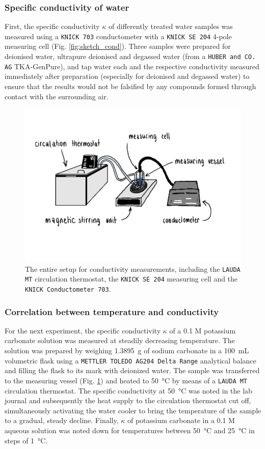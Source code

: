 \subsubsection{Specific conductivity of water}

First, the specific conductivity $\kappa$ of differently treated water samples was measured using a \texttt{KNICK 703} conductometer with a \texttt{KNICK SE 204} 4-pole measuring cell (Fig. \ref{fig:sketch_cond}). Three samples were prepared for deionised water, ultrapure deionised and degassed water (from a \texttt{HUBER and CO. AG} TKA-GenPure), and tap water each and the respective conductivity measured immediately after preparation (especially for deionised and degassed water) to ensure that the results would not be falsified by any compounds formed through contact with the surrounding air. 



\begin{figure}[H]
    \centering
    \includegraphics[width=.5\textwidth]{figures/Conductometer_bigpicture.pdf}
    \caption{The entire setup for conductivity measurements, including the \texttt{LAUDA MT} circulation thermostat, the \texttt{KNICK SE 204} measuring cell and the \texttt{KNICK Conductometer 703}.}
    \label{fig:sketch_cond_2}
\end{figure}

\subsubsection{Correlation between temperature and conductivity}

For the next experiment, the specific conductivity $\kappa$ of a 0.1 M potassium carbonate solution was measured at steadily decreasing temperature. 
The solution was prepared by weighing \qty[round-precision=5]{1.3895}{\gram} of sodium carbonate in a \qty{100}{\milli\liter} volumetric flask using a \texttt{METTLER TOLEDO AG204 Delta Range} analytical balance and filling the flask to its mark with deionized water. 
The sample was transferred to the measuring vessel (Fig. \ref{fig:sketch_cond_2}) and heated to \qty{50}{\celsius} by means of a \texttt{LAUDA MT} circulation thermostat. The specific conductivity at \qty{50}{\celsius} was noted in the lab journal and subsequently the heat supply to the circulation thermostat cut off, simultaneously activating the water cooler to bring the temperature of the sample to a gradual, steady decline. 
Finally, $\kappa$ of potassium carbonate in a 0.1 M aqueous solution was noted down for temperatures between \qty{50} {\celsius} and \qty{25}{\celsius} in steps of \qty{1}{\celsius}.



